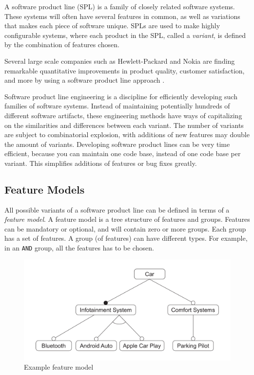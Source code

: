 \documentclass[a4paper,english]{ifimaster}
\begin{document}
A software product line (SPL) is a family of closely related software systems. These systems will often have several features in common, as well as variations that makes each piece of software unique. SPLs are used to make highly configurable systems, where each product in the SPL, called a \textit{variant}, is defined by the combination of features chosen. 

Several large scale companies such as Hewlett-Packard and Nokia are finding remarkable quantitative improvements in product quality, customer satisfaction, and more by using a software product line approach \cite{cite:northrop_spl_tenets}.

Software product line engineering is a discipline for efficiently developing such families of software systems. Instead of maintaining potentially hundreds of different software artifacts, these engineering methods have ways of capitalizing on the similarities and differences between each variant. The number of variants are subject to combinatorial explosion, with additions of new features may double the amount of variants. Developing software product lines can be very time efficient, because you can maintain one code base, instead of one code base per variant. This simplifies additions of features or bug fixes greatly.

\subsection{Feature Models}%
\label{sub:feature_models}

All possible variants of a software product line can be defined in terms of a \textit{feature model}. A feature model is a tree structure of features and groups. Features can be mandatory or optional, and will contain zero or more groups. Each group has a set of features. A group (of features) can have different types. For example, in an \texttt{AND} group, all the features has to be chosen.

\begin{figure}[htpb]
	\centering
	\includegraphics[width=0.8\linewidth]{illustrations/example.pdf}
	\caption{Example feature model}%
	\label{fig:example1}
\end{figure}
\end{document}
